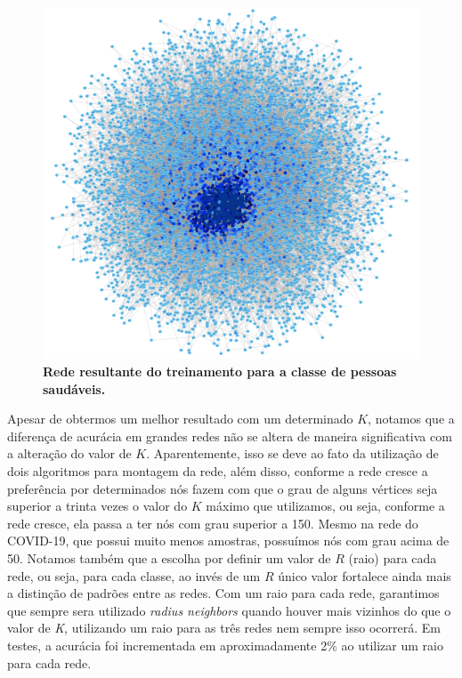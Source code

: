 \documentclass[
12pt,        %
oneside,     %
a4paper,     %
english,       %
brazil        %
%
%
]{ppgca}
\begin{document}
\begin{figure}[H]
    \includegraphics[width=\textwidth]{redereduzida2.png}
    \centering
    \caption{\textbf{Rede resultante do treinamento para a classe de pessoas saudáveis.}}
    \label{fig:redereduzida2}
\end{figure}

Apesar de obtermos um melhor resultado com um determinado $K$, notamos que a diferença de acurácia em grandes redes não se altera de maneira significativa com a alteração do valor de $K$. Aparentemente, isso se deve ao fato da utilização de dois algoritmos para montagem da rede, além disso, conforme a rede cresce a preferência por determinados nós fazem com que o grau de alguns vértices seja superior a trinta vezes o valor do $K$ máximo que utilizamos, ou seja, conforme a rede cresce, ela passa a ter nós com grau superior a 150. Mesmo na rede do COVID-19, que possui muito menos amostras, possuímos nós com grau acima de 50. Notamos também que a escolha por definir um valor de $R$ (raio) para cada rede, ou seja, para cada classe, ao invés de um $R$ único valor fortalece ainda mais a distinção de padrões entre as redes. Com um raio para cada rede, garantimos que sempre sera utilizado \textit{radius neighbors} quando houver mais vizinhos do que o valor de \textit{K}, utilizando um raio para as três redes nem sempre isso ocorrerá. Em testes, a acurácia foi incrementada em aproximadamente 2\% ao utilizar um raio para cada rede. 
\end{document}
